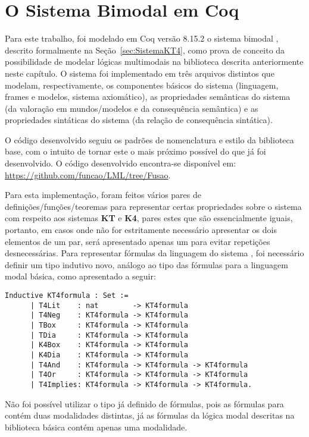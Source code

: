 	  \section{O Sistema Bimodal \texorpdfstring{\SisT}{KT . K4} em Coq}
      \label{sec:SistemaKT4Coq}
      Para este trabalho, foi modelado em Coq versão 8.15.2 o sistema bimodal \SisT, descrito formalmente na Seção~\ref{sec:SistemaKT4}, como prova de conceito
      da possibilidade de modelar lógicas multimodais na biblioteca descrita anteriormente neste capítulo.
      O sistema foi implementado em três arquivos distintos que modelam, respectivamente, os componentes básicos do sistema (linguagem, frames e modelos, sistema axiomático),
      as propriedades semânticas do sistema (da valoração em mundos/modelos e da consequência semântica) e as propriedades sintáticas do sistema (da relação de consequência sintática).

      O código desenvolvido seguiu os padrões de nomenclatura e estilo da biblioteca base, com o intuito de tornar
      este o mais próximo possível do que já foi desenvolvido. O código desenvolvido encontra-se disponível em: \url{https://github.com/funcao/LML/tree/Fusao}.

      Para esta implementação, foram feitos vários pares de definições/funções/teoremas para representar certas propriedades sobre o sistema \SisT com respeito aos sistemas
      \textbf{KT} e \textbf{K4}, pares estes que são essencialmente iguais, portanto, em casos onde não for estritamente necessário apresentar os dois elementos de um par, será apresentado
      apenas um para evitar repetições desnecessárias. Para representar fórmulas da linguagem do sistema \SisT, foi necessário definir um tipo indutivo novo,
      análogo ao tipo das fórmulas para a linguagem modal básica, como apresentado a seguir:

      \begin{lstlisting}[language=coq]
    Inductive KT4formula : Set :=
      | T4Lit    : nat        -> KT4formula
      | T4Neg    : KT4formula -> KT4formula
      | TBox     : KT4formula -> KT4formula
      | TDia     : KT4formula -> KT4formula
      | K4Box    : KT4formula -> KT4formula
      | K4Dia    : KT4formula -> KT4formula
      | T4And    : KT4formula -> KT4formula -> KT4formula
      | T4Or     : KT4formula -> KT4formula -> KT4formula
      | T4Implies: KT4formula -> KT4formula -> KT4formula.
      \end{lstlisting}
      Não foi possível utilizar o tipo já definido de fórmulas, pois as fórmulas para \SisT contém duas modalidades distintas, já as fórmulas da lógica
      modal descritas na biblioteca básica contém apenas uma modalidade.

